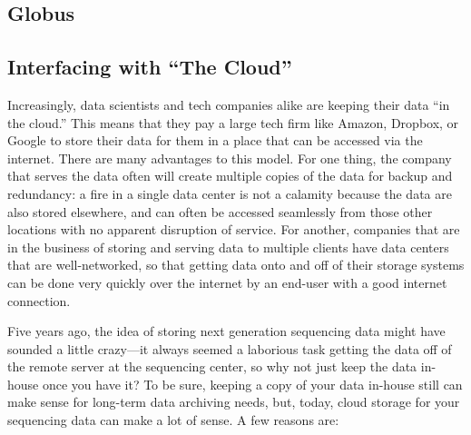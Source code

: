 \documentclass[]{krantz}
\begin{document}
\hypertarget{globus}{%
\subsection{Globus}\label{globus}}

\hypertarget{interfacing-with-the-cloud}{%
\subsection{Interfacing with ``The Cloud''}\label{interfacing-with-the-cloud}}

Increasingly, data scientists and tech companies alike are keeping their
data ``in the cloud.'' This means that they
pay a large tech firm like Amazon, Dropbox, or Google to store their data for them in
a place that can be accessed via the internet. There are many advantages to this
model. For one thing, the company that serves the data often will create multiple copies
of the data for backup and redundancy: a fire in a single data center is not a calamity
because the data are also stored elsewhere, and can often be accessed seamlessly from those
other locations with no apparent disruption of service. For another, companies that are
in the business of storing and serving
data to multiple clients have data centers that are well-networked, so that getting
data onto and off of their storage systems can be done very quickly over the internet
by an end-user with a good internet connection.

Five years ago, the idea of storing next generation sequencing data might have
sounded a little
crazy---it always seemed a laborious task getting the data off of the remote server at the
sequencing center, so why not just keep the data in-house once you have it?
To be sure, keeping a copy of your
data in-house still can make sense for long-term data archiving needs, but, today, cloud
storage for your sequencing data can make a lot of sense. A few reasons are:
\end{document}
